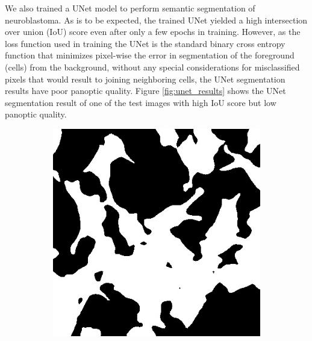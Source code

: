 \documentclass[journal]{IEEEtran}
\begin{document}
We also trained a UNet model to perform semantic segmentation of neuroblastoma. As is to be expected, the trained UNet yielded a high intersection over union (IoU) score even after only a few epochs in training. However, as the loss function used in training the UNet is the standard binary cross entropy function that minimizes pixel-wise the error in segmentation of the foreground (cells) from the background, without any special considerations for misclassified pixels that would result to joining neighboring cells, the UNet segmentation results have poor panoptic quality. Figure \ref{fig:unet_results} shows the UNet segmentation result of one of the test images with high IoU score but low panoptic quality.

\begin{figure}
\centering
\begin{subfigure}[b]{0.45\linewidth}
\includegraphics[width=\linewidth]{deeplab/110115.jpg}
\caption{}
\end{subfigure}
\begin{subfigure}[b]{0.45\linewidth}

\end{subfigure}
\end{figure}
\end{document}
